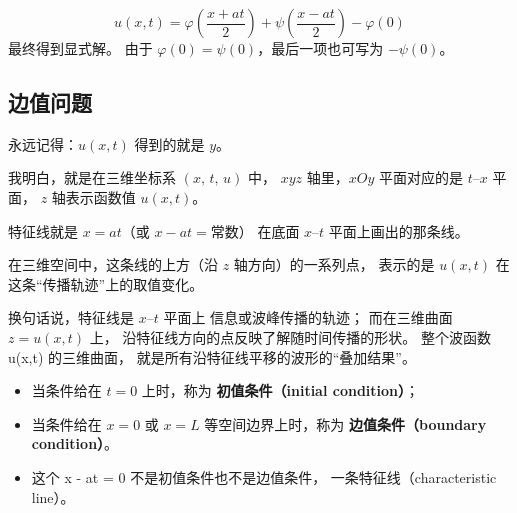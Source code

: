 \begin{dxsolution}
\[
\boxed{
u(x,t)
= \varphi\!\left(\frac{x+at}{2}\right)
+ \psi\!\left(\frac{x-at}{2}\right)
- \varphi(0)
}
\]
\tcblower
最终得到显式解。  
由于 $\varphi(0)=\psi(0)$，最后一项也可写为 $-\psi(0)$。
\end{dxsolution}

\subsection{边值问题}
\begin{dxtips}[如何理解图像]
永远记得：$u(x,t)$ 得到的就是 $y$。

我明白，就是在三维坐标系 $(x,\,t,\,u)$ 中，  
$xyz$ 轴里，$xOy$ 平面对应的是 $t$–$x$ 平面，  
$z$ 轴表示函数值 $u(x,t)$。

特征线就是 $x=at$（或 $x-at=\text{常数}$）  
在底面 $x$–$t$ 平面上画出的那条线。

在三维空间中，这条线的上方（沿 $z$ 轴方向）的一系列点，  
表示的是 $u(x,t)$ 在这条“传播轨迹”上的取值变化。

换句话说，特征线是 $x$–$t$ 平面上  
信息或波峰传播的轨迹；  
而在三维曲面 $z=u(x,t)$ 上，  
沿特征线方向的点反映了解随时间传播的形状。
整个波函数 u(x,t) 的三维曲面，
就是所有沿特征线平移的波形的“叠加结果”。
\end{dxtips}
\begin{dxtips}[条件辨析]
    \begin{itemize}
  \item 当条件给在 $t=0$ 上时，称为 \textbf{初值条件（initial condition）}；
  \item 当条件给在 $x=0$ 或 $x=L$ 等空间边界上时，称为 \textbf{边值条件（boundary condition）}。
  \item 这个 x - at = 0 不是初值条件也不是边值条件，
一条特征线（characteristic line）。
\end{itemize}
\end{dxtips}

